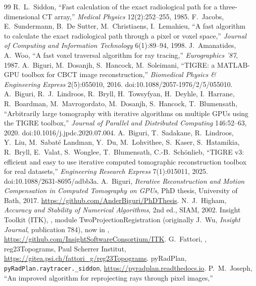 \documentclass[11pt,a4paper]{article}
\theoremstyle{remark}
\begin{document}
\begin{thebibliography}{99}
 R.~L.~Siddon, ``Fast calculation of the exact radiological path for a
three-dimensional CT array,'' \emph{Medical Physics} 12(2):252--255, 1985.
 F.~Jacobs, E.~Sundermann, B.~De Sutter, M.~Christiaens, I.~Lemahieu, ``A fast
algorithm to calculate the exact radiological path through a pixel or voxel space,'' \emph{Journal of
Computing and Information Technology} 6(1):89--94, 1998.
 J.~Amanatides, A.~Woo, ``A fast voxel traversal algorithm for ray tracing,''
\emph{Eurographics '87}, 1987.
 A.~Biguri, M.~Dosanjh, S.~Hancock, M.~Soleimani, ``TIGRE: a MATLAB-GPU toolbox for CBCT
image reconstruction,'' \emph{Biomedical Physics \& Engineering Express} 2(5):055010, 2016.
doi:10.1088/2057-1976/2/5/055010.
 A.~Biguri, R.~J.~Lindroos, R.~Bryll, H.~Towsyfyan, H.~Deyhle, I.~Harrane,
R.~Boardman, M.~Mavrogordato, M.~Dosanjh, S.~Hancock, T.~Blumensath, ``Arbitrarily large tomography with
iterative algorithms on multiple GPUs using the TIGRE toolbox,'' \emph{Journal of Parallel and Distributed
Computing} 146:52--63, 2020. doi:10.1016/j.jpdc.2020.07.004.
 A.~Biguri, T.~Sadakane, R.~Lindroos, Y.~Liu, M.~Sabat\'e Landman, Y.~Du, M.~Lohvithee,
S.~Kaser, S.~Hatamikia, R.~Bryll, E.~Valat, S.~Wonglee, T.~Blumensath, C.-B.~Sch\"onlieb, ``TIGRE v3: efficient
and easy to use iterative computed tomographic reconstruction toolbox for real datasets,''
\emph{Engineering Research Express} 7(1):015011, 2025. doi:10.1088/2631-8695/adbb3a.
 A.~Biguri, \emph{Iterative Reconstruction and Motion Compensation in Computed Tomography
on GPUs}, PhD thesis, University of Bath, 2017. \url{https://github.com/AnderBiguri/PhDThesis}.
 N.~J.~Higham, \emph{Accuracy and Stability of Numerical Algorithms}, 2nd ed., SIAM, 2002.
 Insight Toolkit (ITK), , module
TwoProjectionRegistration (originally J.~Wu, \emph{Insight Journal}, publication 784), now in ,
\url{https://github.com/InsightSoftwareConsortium/ITK}.
 G.~Fattori, , reg23Topograms, Paul
Scherrer Institut, \url{https://gitea.psi.ch/fattori_g/reg23Topograms}.
 pyRadPlan, \texttt{pyRadPlan.raytracer.\_siddon},
\url{https://pyradplan.readthedocs.io}.
 P.~M.~Joseph, ``An improved algorithm for reprojecting rays through pixel images,''

\end{thebibliography}
\end{document}
